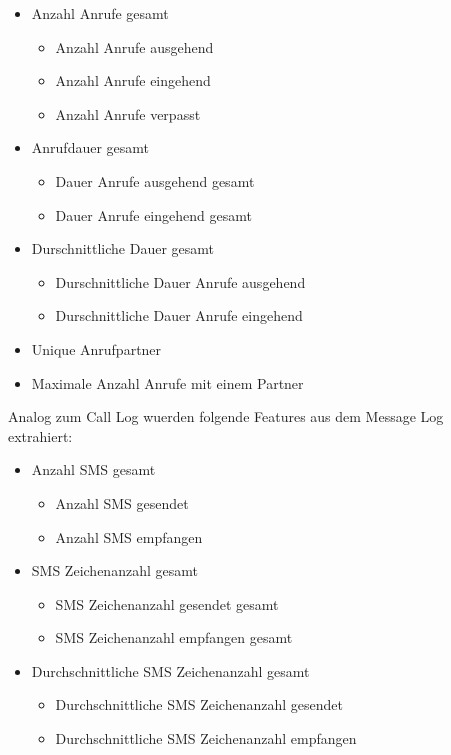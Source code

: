 \begin{itemize}
    \item Anzahl Anrufe gesamt
    \begin{itemize}
        \item Anzahl Anrufe ausgehend
        \item Anzahl Anrufe eingehend
        \item Anzahl Anrufe verpasst
    \end{itemize}

    \item Anrufdauer gesamt
    \begin{itemize}
        \item Dauer Anrufe ausgehend gesamt
        \item Dauer Anrufe eingehend gesamt
    \end{itemize}

    \item Durschnittliche Dauer gesamt
    \begin{itemize}
        \item Durschnittliche Dauer Anrufe ausgehend
        \item Durschnittliche Dauer Anrufe eingehend
    \end{itemize}

    \item Unique Anrufpartner
    \item Maximale Anzahl Anrufe mit einem Partner

\end{itemize}

Analog zum Call Log wuerden folgende Features aus dem Message Log extrahiert:

\begin{itemize}
    \item Anzahl SMS gesamt
    \begin{itemize}
        \item Anzahl SMS gesendet
        \item Anzahl SMS empfangen
    \end{itemize}

    \item SMS Zeichenanzahl gesamt
    \begin{itemize}
        \item SMS Zeichenanzahl gesendet gesamt
        \item SMS Zeichenanzahl empfangen gesamt
    \end{itemize}

    \item Durchschnittliche SMS Zeichenanzahl gesamt
    \begin{itemize}
        \item Durchschnittliche SMS Zeichenanzahl gesendet
        \item Durchschnittliche SMS Zeichenanzahl empfangen
    \end{itemize}

\end{itemize}



